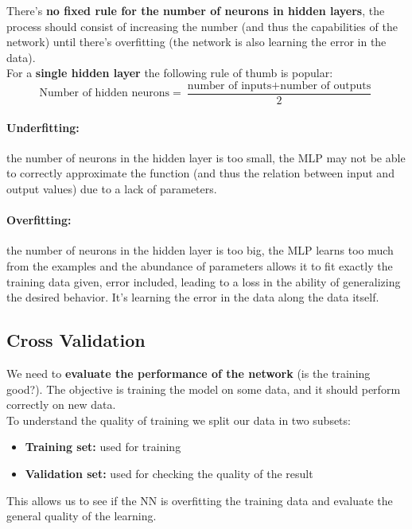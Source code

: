 There's \textbf{no fixed rule for the number of neurons in hidden layers}, the process should consist of increasing the number (and thus the capabilities of the network) until there's overfitting (the network is also learning the error in the data).\\

For a \textbf{single hidden layer} the following rule of thumb is popular: 
$$ \text{Number of hidden neurons} = \frac{\text{number of inputs} + \text{number of outputs}}{2}$$

\paragraph{Underfitting:} the number of neurons in the hidden layer is too small, the MLP may not be able to correctly approximate the function (and thus the relation between input and output values) due to a lack of parameters.\\

\paragraph{Overfitting:} the number of neurons in the hidden layer is too big, the MLP learns too much from the examples and the abundance of parameters allows it to fit exactly the training data given, error included, leading to a loss in the ability of generalizing the desired behavior. It's learning the error in the data along the data itself.\\

\newpage

\subsection{Cross Validation}
We need to \textbf{evaluate the performance of the network} (is the training good?). The objective is training the model on some data, and it should perform correctly on new data. \\

To understand the quality of training we split our data in two subsets: 
\begin{itemize}
	\item \textbf{Training set:} used for training
	\item \textbf{Validation set:} used for checking the quality of the result
\end{itemize}
This allows us to see if the NN is overfitting the training data and evaluate the general quality of the learning. \\

